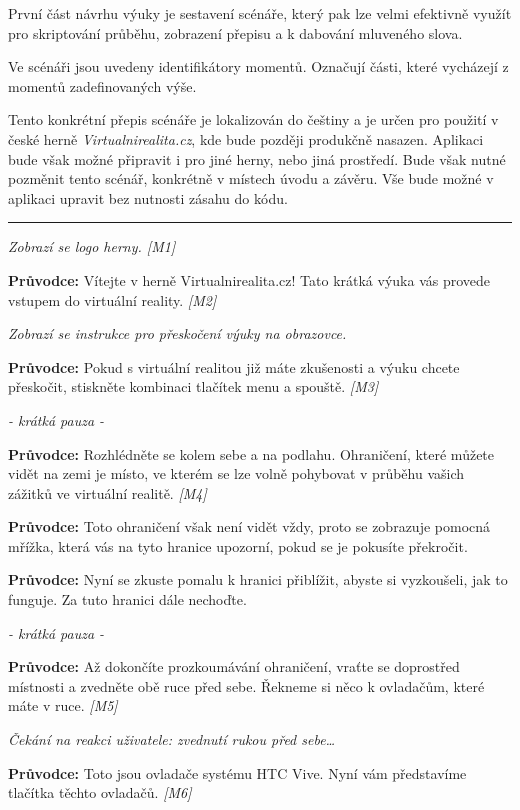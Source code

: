 První část návrhu výuky je sestavení scénáře, který pak lze velmi
efektivně využít pro skriptování průběhu, zobrazení přepisu a k dabování
mluveného slova.

Ve scénáři jsou uvedeny identifikátory momentů. Označují části, které
vycházejí z momentů zadefinovaných výše.

Tento konkrétní přepis scénáře je lokalizován do češtiny a je určen pro
použití v české herně \emph{Virtualnirealita.cz}, kde bude později
produkčně nasazen. Aplikaci bude však možné připravit i pro jiné herny,
nebo jiná prostředí. Bude však nutné pozměnit tento scénář, konkrétně v
místech úvodu a závěru. Vše bude možné v aplikaci upravit bez nutnosti
zásahu do kódu.

\begin{center}\rule{0.5\linewidth}{\linethickness}\end{center}

\emph{Zobrazí se logo herny. {[}M1{]}}

\textbf{Průvodce:} Vítejte v herně Virtualnirealita.cz! Tato krátká
výuka vás provede vstupem do virtuální reality. \emph{{[}M2{]}}

\emph{Zobrazí se instrukce pro přeskočení výuky na obrazovce.}

\textbf{Průvodce:} Pokud s virtuální realitou již máte zkušenosti a
výuku chcete přeskočit, stiskněte kombinaci tlačítek menu a spouště.
\emph{{[}M3{]}}

\emph{- krátká pauza -}

\textbf{Průvodce:} Rozhlédněte se kolem sebe a na podlahu. Ohraničení,
které můžete vidět na zemi je místo, ve kterém se lze volně pohybovat v
průběhu vašich zážitků ve virtuální realitě. \emph{{[}M4{]}}

\textbf{Průvodce:} Toto ohraničení však není vidět vždy, proto se
zobrazuje pomocná mřížka, která vás na tyto hranice upozorní, pokud se
je pokusíte překročit.

\textbf{Průvodce:} Nyní se zkuste pomalu k hranici přiblížit, abyste si
vyzkoušeli, jak to funguje. Za tuto hranici dále nechoďte.

\emph{- krátká pauza -}

\textbf{Průvodce:} Až dokončíte prozkoumávání ohraničení, vraťte se
doprostřed místnosti a zvedněte obě ruce před sebe. Řekneme si něco k
ovladačům, které máte v ruce. \emph{{[}M5{]}}

\emph{Čekání na reakci uživatele: zvednutí rukou před sebe\ldots{}}

\textbf{Průvodce:} Toto jsou ovladače systému HTC Vive. Nyní vám
představíme tlačítka těchto ovladačů. \emph{{[}M6{]}}

